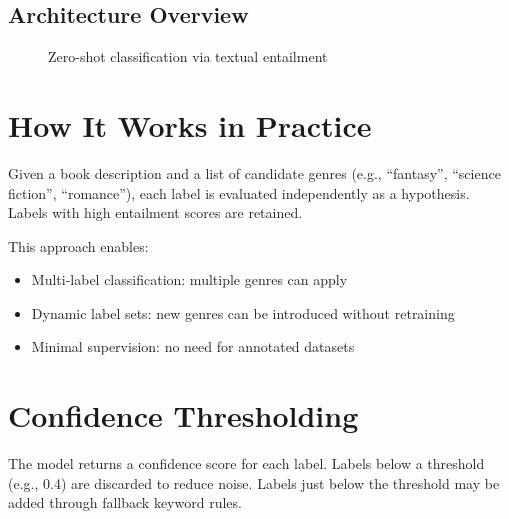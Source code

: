 \subsection*{Architecture Overview}
\begin{figure}[H]
\centering
{}
\caption{Zero-shot classification via textual entailment}
\end{figure}

\section{How It Works in Practice}
Given a book description and a list of candidate genres (e.g., “fantasy”, “science fiction”, “romance”), each label is evaluated independently as a hypothesis. Labels with high entailment scores are retained.

This approach enables:
\begin{itemize}
    \item Multi-label classification: multiple genres can apply
    \item Dynamic label sets: new genres can be introduced without retraining
    \item Minimal supervision: no need for annotated datasets
\end{itemize}

\section{Confidence Thresholding}
The model returns a confidence score for each label. Labels below a threshold (e.g., 0.4) are discarded to reduce noise. Labels just below the threshold may be added through fallback keyword rules.

